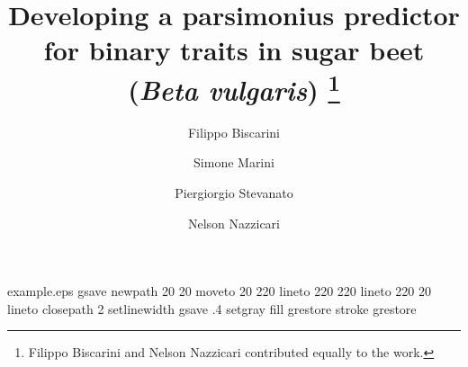 %
%
%
%
%
\begin{filecontents*}{example.eps}
gsave
newpath
  20 20 moveto
  20 220 lineto
  220 220 lineto
  220 20 lineto
closepath
2 setlinewidth
gsave
  .4 setgray fill
grestore
stroke
grestore
\end{filecontents*}
%
\RequirePackage{fix-cm}
%
\documentclass[smallextended]{svjour3}       %
%
\smartqed  %
%
%
%
\usepackage{longtable}
\usepackage{xfrac}
\usepackage{graphicx}
%
%
%


\title{Developing a parsimonius predictor for binary traits in sugar
  beet (\emph{Beta vulgaris}) \thanks{Filippo Biscarini and Nelson Nazzicari contributed
    equally to the work.}
}


\author{Filippo Biscarini  \and
        Simone Marini \and
	Piergiorgio Stevanato \and
	Nelson Nazzicari %
}


